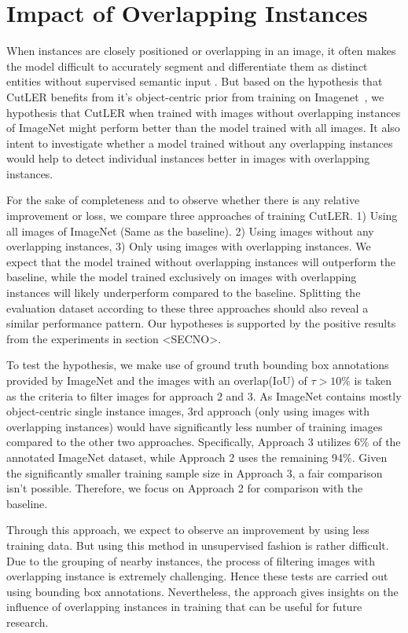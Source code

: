 \section{Impact of Overlapping Instances}
\label{section:analysis_ol_instancs}
When instances are closely positioned or overlapping in an image, it often makes the model difficult to accurately segment and differentiate them as distinct entities without supervised semantic input \cite{kara2022image}. But based on the hypothesis that CutLER benefits from it's object-centric prior from training on Imagenet~\cite{engstler2023understanding}, we hypothesis that CutLER when trained with images without overlapping instances of ImageNet might perform better than the model trained with all images. It also intent to investigate whether a model trained without any overlapping instances would help to detect individual instances better in images with overlapping instances.

For the sake of completeness and to observe whether there is any relative improvement or loss, we compare three approaches of training CutLER. 1) Using all images of ImageNet (Same as the baseline). 2) Using images without any overlapping instances, 3)  Only using images with overlapping instances. We expect that the model trained without overlapping instances will outperform the baseline, while the model trained exclusively on images with overlapping instances will likely underperform compared to the baseline. Splitting the evaluation dataset according to these three approaches should also reveal a similar performance pattern. Our hypotheses is supported by the positive results from the experiments in section <SECNO>.

To test the hypothesis, we make use of ground truth bounding box annotations provided by ImageNet and the images with an overlap(IoU) of \(\tau > \text{10\%}\) is taken as the criteria to filter images for approach 2 and 3. As ImageNet contains mostly object-centric single instance images, 3rd approach (only using images with overlapping instances) would have significantly less number of training images compared to the other two approaches. Specifically, Approach 3 utilizes 6\% of the annotated ImageNet dataset, while Approach 2 uses the remaining 94\%. Given the significantly smaller training sample size in Approach 3, a fair comparison isn't possible. Therefore, we focus on Approach 2 for comparison with the baseline.

Through this approach, we expect to observe an improvement by using less training data. But using this method in unsupervised fashion is rather difficult. Due to the grouping of nearby instances, the process of filtering images with overlapping instance is extremely challenging. Hence these tests are carried out using bounding box annotations. Nevertheless, the approach gives insights on the influence of overlapping instances in training that can be useful for future research.

